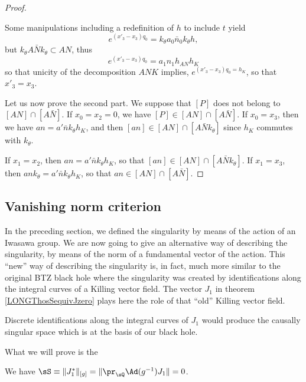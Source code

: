 \begin{proof}
\begin{enumerate}
\begin{subequations}
			\end{subequations}
			Some manipulations including a redefinition of $h$ to include $t$ yield
			\begin{equation}
				e^{(x'_3-x_3)q_0}=k_{\theta}a_0\bar n_0k_{\theta}h,
			\end{equation}
			but $k_{\theta}A\bar Nk_{\theta}\subset AN$, thus
			\begin{equation}
				e^{(x'_3-x_3)q_0}=a_1n_1h_{AN}h_K
			\end{equation}
			so that unicity of the decomposition $ANK$ implies, $ e^{(x'_3-x_3)q_0=h_K}$, so that $x'_3=x_3$. 
	\end{enumerate}
	Let us now prove the second part. We suppose that $[P]$ does not belong to $[AN]\cap[A\bar N]$. If $x_0=x_2=0$, we have $[P]\in[AN]\cap[A\bar N]$. If $x_0=x_3$, then we have $an=a'\bar nk_{\theta}h_K$, and then $[an]\in[AN]\cap[A\bar Nk_{\theta}]$ since $h_K$ commutes with $k_{\theta}$.

	 If $x_1=x_2$, then $an=a'\bar nk_{\theta}h_K$, so that $[an]\in[AN]\cap[A\bar Nk_{\theta}]$. If $x_1=x_3$, then $ank_{\theta}=a'\bar nk_{\theta}h_K$, so that $an\in[AN]\cap[A\bar N]$.
\end{proof}

%
\subsection{Vanishing norm criterion}
%

In the preceding section, we defined the singularity by means of the action of an Iwasawa group. We are now going to give an alternative way of describing the singularity, by means of the norm of a fundamental vector of the action. This ``new'' way of describing the singularity is, in fact, much more similar to the original BTZ black hole where the singularity was created by identifications along the integral curves of a Killing vector field\cite{these_Detournay}. The vector $J_1$ in theorem \ref{LONGThosSequivJzero} plays here the role of that ``old'' Killing vector field.

Discrete identifications along the integral curves of $J_1$ would produce the causally singular space which is at the basis of our black hole.

What we will prove is the
\begin{theorem}		\label{LONGThosSequivJzero}
	We have $\sS\equiv \| J_1^* \|_{[g]}=\| \pr_{\sQ}\Ad(g^{-1})J_1 \|=0$.
\end{theorem}

